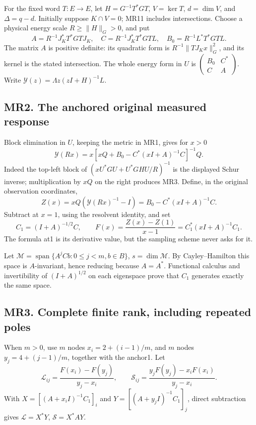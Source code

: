 \documentclass[11pt]{article}
\begin{document}
For the fixed word \(T:E\to E\), let \(H=G^{-1}T^*GT\), \(V=\ker T\), \(d=\dim V\), and \(\Delta=q-d\). Initially suppose \(K\cap V=0\); MR11 includes intersections. Choose a physical energy scale \(R\ge\|H\|_G>0\), and put \[
 A=R^{-1}J_K^*T^*GTJ_K,\quad
 C=R^{-1}J_K^*T^*GTL,\quad
 B_0=R^{-1}L^*T^*GTL.
\tag{MR2}
\] The matrix \(A\) is positive definite: its quadratic form is \(R^{-1}\|TJ_Kx\|_G^2\), and its kernel is the stated intersection. The whole energy form in \(U\) is \(\left(\begin{smallmatrix}B_0&C^*\\ C&A\end{smallmatrix}\right)\). Write \(\mathscr Y(z)=\Lambda z(zI+H)^{-1}L\).

\subsection{MR2. The anchored original measured response}\label{mr2.-the-anchored-original-measured-response}

Block elimination in \(U\), keeping the metric in MR1, gives for \(x>0\) \[
 \mathscr Y(Rx)=x[xQ+B_0-C^*(xI+A)^{-1}C]^{-1}Q.
\tag{MR3}
\] Indeed the top-left block of \((xU^*GU+U^*GHU/R)^{-1}\) is the displayed Schur inverse; multiplication by \(xQ\) on the right produces MR3. Define, in the original observation coordinates, \[
 Z(x)=xQ(\mathscr Y(Rx)^{-1}-I)
     =B_0-C^*(xI+A)^{-1}C.
\tag{MR4}
\] Subtract at \(x=1\), using the resolvent identity, and set \[
 C_1=(I+A)^{-1/2}C,\qquad
 F(x)=\frac{Z(x)-Z(1)}{x-1}
     =C_1^*(xI+A)^{-1}C_1 .
\tag{MR5}
\] The formula at1 is its derivative value, but the sampling scheme never asks for it.

Let \(\mathcal M=\operatorname{span}\{A^jCb:0\le j<m,b\in B\}\), \(s=\dim\mathcal M\). By Cayley--Hamilton this space is \(A\)-invariant, hence reducing because \(A=A^*\). Functional calculus and invertibility of \((I+A)^{1/2}\) on each eigenspace prove that \(C_1\) generates exactly the same space.

\subsection{MR3. Complete finite rank, including repeated poles}\label{mr3.-complete-finite-rank-including-repeated-poles}

When \(m>0\), use \(m\) nodes \(x_i=2+(i-1)/m\), and \(m\) nodes \(y_j=4+(j-1)/m\), together with the anchor1. Let \[
 \mathcal L_{ij}=\frac{F(x_i)-F(y_j)}{y_j-x_i},\qquad
 \mathcal S_{ij}=\frac{y_jF(y_j)-x_iF(x_i)}{y_j-x_i}.
\tag{MR6}
\] With \(X=[(A+x_iI)^{-1}C_1]_i\) and \(Y=[(A+y_jI)^{-1}C_1]_j\), direct subtraction gives \(\mathcal L=X^*Y\), \(\mathcal S=X^*AY\).
\end{document}
